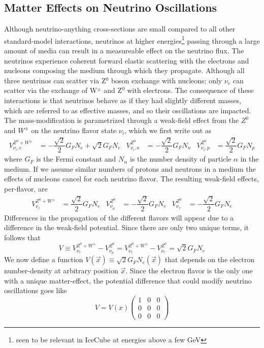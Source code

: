 \documentclass[main.tex]{subfiles}
\begin{document}
\subsection{Matter Effects on Neutrino Oscillations}
Although neutrino-anything cross-sections are small compared to all other standard-model interactions, neutrinos at higher energies\footnote{seen to be relevant in IceCube at energies above a few GeV} passing through a large amount of media can result in a measureable effect on the neutrino flux. 
The neutrinos experience coherent forward elastic scattering with the electrons and nucleons composing the medium through which they propagate. Although all three neutrinos can scatter via Z$^{0}$ boson exchange with nucleons; only $\nu_{e}$ can scatter via the exchange of W$^{\pm}$ and Z$^{0}$ with electrons. 
The consequence of these interactions is that neutrinos behave as if they had slightly different masses, which are referred to as effective masses, and so their oscillations are impacted.  
The mass-modification is parametrized through a weak-field effect from the $Z^{0}$ and $W^{\pm}$ on the neutrino flavor state $\nu_{i}$, which we first write out as
\begin{align} 
    V_{\nu_{i}, e}^{Z^{0}+W^{\pm}} &= -\dfrac{\sqrt{2}}{2}G_{F} N_{e} + \sqrt{2}G_{F}N_{e}  & V_{\nu_{i}, n}^{Z^{0}} &= -\dfrac{\sqrt{2}}{2}G_{F} N_{n} & V_{\nu_{i}, p}^{Z^{0}} &= \dfrac{\sqrt{2}}{2}G_{F} N_{p}
\end{align}
where $G_{F}$ is the Fermi constant and $N_{\alpha}$ is the number density of particle $\alpha$ in the medium. 
If we assume similar numbers of protons and neutrons in a medium the effects of nucleons cancel for each neutrino flavor. 
The resulting weak-field effects, per-flavor, are
\begin{align} \label{eq:matter_weak}
    V_{\nu_{e}}^{Z^{0}+W^{\pm}} &= \dfrac{\sqrt{2}}{2}G_{F} N_{e}  & V_{\nu_{\mu}}^{Z^{0}} &= -\dfrac{\sqrt{2}}{2}G_{F} N_{e} & V_{\nu_{\tau}}^{Z^{0}} &= -\dfrac{\sqrt{2}}{2}G_{F} N_{e}
\end{align}
Differences in the propagation of the different flavors will appear due to a difference in the weak-field potential. 
Since there are only two unique terms, it follows that 
\begin{equation}
    V \equiv V_{\nu_{e}}^{Z^{0}+W^{\pm}} -  V_{\nu_{\mu}}^{Z^{0}}  =  V_{\nu_{e}}^{Z^{0}+W^{\pm}} -  V_{\nu_{\tau}}^{Z^{0}}   = \sqrt{2} G_{F} N_{e}
\end{equation}
We now define a function $V(\vec{x})\equiv  \sqrt{2} G_{F} N_{e}(\vec{x})$ that depends on the electron number-density at arbitrary position $\vec{x}$.  
Since the electron flavor is the only one with a unique matter-effect, the potential difference that could modify neutrino oscillations goes like 
\begin{equation}
    V = V(x)\left(\begin{array}{ccc} 1&0&0\\0&0&0 \\0&0&0 \end{array}\right) 
\end{equation}
\end{document}
